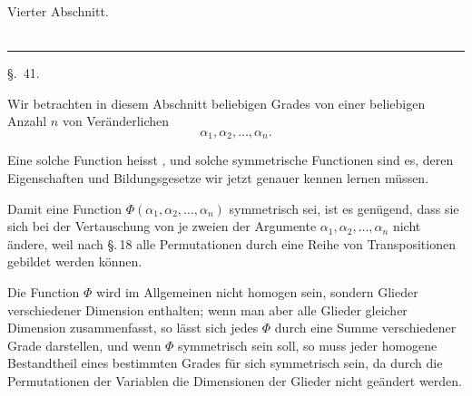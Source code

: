 
\begin{center}
{\Large Vierter Abschnitt.}\\[0.8em]
{\Large{}}\\[0.8em]
\rule{0.16\textwidth}{0.4pt}
\end{center}

\begin{center}
{\large \S.\ 41.}

\vspace{0.5em}
{\large{}}

{\large{}}
\end{center}

Wir betrachten in diesem Abschnitt  beliebigen Grades von einer beliebigen Anzahl $n$ von Veränderlichen
\[
 \alpha_1,\alpha_2,\ldots,\alpha_n.
\]

Eine solche Function heisst ,  und solche symmetrische Functionen sind es, deren Eigenschaften und Bildungsgesetze wir jetzt genauer kennen lernen müssen.

Damit eine Function $\Phi(\alpha_1,\alpha_2,\ldots,\alpha_n)$ symmetrisch sei, ist es genügend, dass sie sich bei der Vertauschung von je zweien der Argumente $\alpha_1,\alpha_2,\ldots,\alpha_n$ nicht ändere, weil nach \S.\,18 alle Permutationen durch eine Reihe von Transpositionen gebildet werden können.

Die Function $\Phi$ wird im Allgemeinen nicht homogen sein, sondern Glieder verschiedener Dimension enthalten; wenn man aber alle Glieder gleicher Dimension zusammenfasst, so lässt sich jedes $\Phi$ durch eine Summe  verschiedener Grade darstellen, und wenn $\Phi$ symmetrisch sein soll, so muss jeder homogene Bestandtheil eines bestimmten Grades für sich symmetrisch sein, da durch die Permutationen der Variablen die Dimensionen der Glieder nicht geändert werden.
